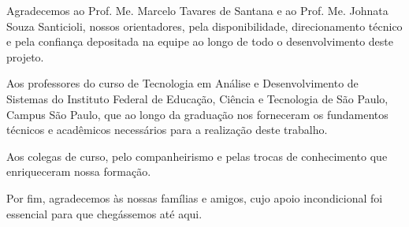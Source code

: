\begin{agradecimentos}
Agradecemos ao Prof. Me. Marcelo Tavares de Santana e ao Prof. Me. Johnata Souza Santicioli, nossos orientadores, pela 
disponibilidade, direcionamento técnico e pela confiança depositada na equipe ao 
longo de todo o desenvolvimento deste projeto.

Aos professores do curso de Tecnologia em Análise e Desenvolvimento de Sistemas 
do Instituto Federal de Educação, Ciência e Tecnologia de São Paulo, Campus São 
Paulo, que ao longo da graduação nos forneceram os fundamentos técnicos e 
acadêmicos necessários para a realização deste trabalho.

Aos colegas de curso, pelo companheirismo e pelas trocas de conhecimento que 
enriqueceram nossa formação.

Por fim, agradecemos às nossas famílias e amigos, cujo apoio incondicional foi 
essencial para que chegássemos até aqui.
\end{agradecimentos}